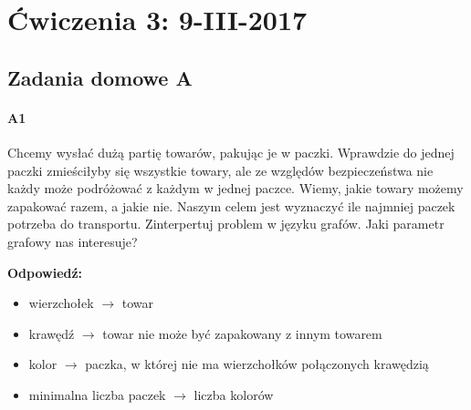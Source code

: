 \section{Ćwiczenia 3: 9-III-2017}
\subsection{Zadania domowe A}
\paragraph{A1} Chcemy wysłać dużą partię towarów, pakując je w paczki. Wprawdzie do jednej paczki zmieściłyby się wszystkie towary, ale ze względów bezpieczeństwa nie każdy może podróżować z każdym w jednej paczce. Wiemy, jakie towary możemy zapakować razem, a jakie nie. Naszym celem jest wyznaczyć ile najmniej paczek potrzeba do transportu. Zinterpertuj problem w języku grafów.  Jaki parametr grafowy nas   interesuje?   

\textbf{Odpowiedź:} 
\begin{itemize}
\item wierzchołek $\rightarrow $  towar 
\item krawędź $\rightarrow $ towar nie może być zapakowany z innym towarem
\item kolor $\rightarrow $ paczka, w której nie ma wierzchołków połączonych krawędzią
\item minimalna liczba paczek $\rightarrow $ liczba kolorów
\end{itemize}

